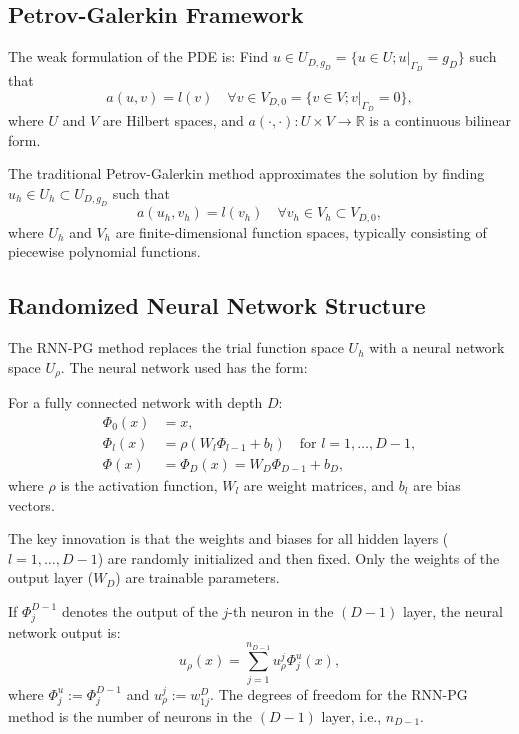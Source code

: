 \documentclass[11pt,a4paper]{article}
\begin{document}
\subsection{Petrov-Galerkin Framework}

The weak formulation of the PDE is: Find $u \in U_{D,g_D} = \{u \in U; u|_{\Gamma_D} = g_D\}$ such that
\begin{equation}
a(u, v) = l(v) \quad \forall v \in V_{D,0} = \{v \in V; v|_{\Gamma_D} = 0\},
\end{equation}
where $U$ and $V$ are Hilbert spaces, and $a(\cdot,\cdot): U \times V \rightarrow \mathbb{R}$ is a continuous bilinear form.

The traditional Petrov-Galerkin method approximates the solution by finding $u_h \in U_h \subset U_{D,g_D}$ such that
\begin{equation}
a(u_h, v_h) = l(v_h) \quad \forall v_h \in V_h \subset V_{D,0},
\end{equation}
where $U_h$ and $V_h$ are finite-dimensional function spaces, typically consisting of piecewise polynomial functions.

\subsection{Randomized Neural Network Structure}

The RNN-PG method replaces the trial function space $U_h$ with a neural network space $U_\rho$. The neural network used has the form:

For a fully connected network with depth $D$:
\begin{align}
\Phi_0(x) &= x, \\
\Phi_l(x) &= \rho(W_l\Phi_{l-1} + b_l) \quad \text{for } l = 1, \ldots, D-1, \\
\Phi(x) &= \Phi_D(x) = W_D\Phi_{D-1} + b_D,
\end{align}
where $\rho$ is the activation function, $W_l$ are weight matrices, and $b_l$ are bias vectors.

The key innovation is that the weights and biases for all hidden layers ($l = 1, \ldots, D-1$) are randomly initialized and then fixed. Only the weights of the output layer ($W_D$) are trainable parameters. 

If $\Phi_j^{D-1}$ denotes the output of the $j$-th neuron in the $(D-1)$ layer, the neural network output is:
\begin{equation}
u_\rho(x) = \sum_{j=1}^{n_{D-1}} u_\rho^j \Phi_j^u(x),
\end{equation}
where $\Phi_j^u := \Phi_j^{D-1}$ and $u_\rho^j := w_{1j}^D$. The degrees of freedom for the RNN-PG method is the number of neurons in the $(D-1)$ layer, i.e., $n_{D-1}$.
\end{document}
